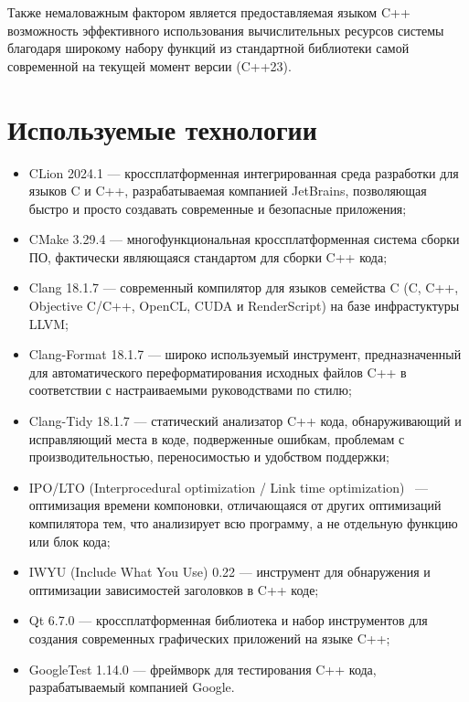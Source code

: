 Также немаловажным фактором является предоставляемая языком C++ возможность эффективного использования вычислительных ресурсов системы благодаря широкому набору функций из стандартной библиотеки самой современной на текущей момент версии (C++23).

\section{Используемые технологии}

\begin{itemize}
	\item CLion 2024.1 \cite{clion} — кроссплатформенная интегрированная среда разработки для языков C и C++, разрабатываемая компанией JetBrains, позволяющая быстро и просто создавать современные и безопасные приложения;
	\item CMake 3.29.4 \cite{cmake} — многофункциональная кроссплатформенная система сборки ПО, фактически являющаяся стандартом для сборки C++ кода;
	\item Clang 18.1.7 \cite{clang} — современный компилятор для языков семейства C (C, C++, Objective C/C++, OpenCL, CUDA и RenderScript) на базе инфрастуктуры LLVM;
	\item Clang-Format 18.1.7 \cite{clang-format} — широко используемый инструмент, предназначенный для автоматического переформатирования исходных файлов C++ в соответствии с настраиваемыми руководствами по стилю;
	\item Clang-Tidy 18.1.7 \cite{clang-tidy} — статический анализатор C++ кода, обнаруживающий и исправляющий места в коде, подверженные ошибкам, проблемам с производительностью, переносимостью и удобством поддержки;
	\item IPO/LTO (Interprocedural optimization / Link time optimization) \cite{ipo-lto}~— оптимизация времени компоновки, отличающаяся от других оптимизаций компилятора тем, что анализирует всю программу, а не отдельную функцию или блок кода;
	\item IWYU (Include What You Use) 0.22 \cite{iwyu} — инструмент для обнаружения и оптимизации зависимостей заголовков в C++ коде;
	\item Qt 6.7.0 \cite{qt} — кроссплатформенная библиотека и набор инструментов для создания современных графических приложений на языке C++;
	\item GoogleTest 1.14.0 \cite{googletest} — фреймворк для тестирования C++ кода, разрабатываемый компанией Google.
\end{itemize}

